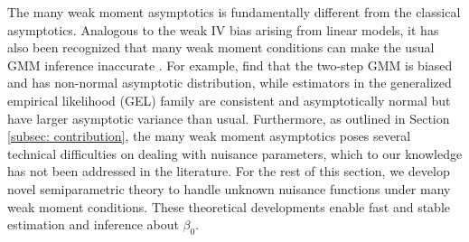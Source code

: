 \documentclass[12pt]{article}
\begin{document}
The many weak moment asymptotics is fundamentally different from the classical asymptotics.   Analogous to the weak IV bias arising from linear models, it has also been recognized that many weak moment conditions can make the usual GMM inference inaccurate \citep{Stock:2002aa}. For example,  \cite{Newey:2009aa} find that the two-step GMM is biased and has non-normal asymptotic distribution, while estimators in the generalized empirical likelihood (GEL) family \citep{Smith:1997aa, Parente:2014aa} are consistent and asymptotically normal but have larger asymptotic variance than usual.  Furthermore,  as outlined in Section \ref{subsec: contribution}, the many weak moment asymptotics poses several technical difficulties on dealing with nuisance parameters, which to our knowledge has not been addressed in the literature. 
For the rest of this section, we develop novel semiparametric theory to handle unknown nuisance functions under many weak moment conditions. These theoretical developments enable fast and stable estimation and inference about $\beta_0$. 
\end{document}
